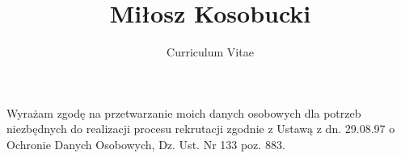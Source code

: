 \documentclass[polish]{curve}
\title{Miłosz Kosobucki}
\subtitle{Curriculum Vitae}
\newcommand{\inPolish}[1]{#1}
\newcommand{\inEnglish}[1]{}
\begin{document}
\newcommand{\CC}{C\nolinebreak\hspace{-.05em}\raisebox{.4ex}{\tiny\textbf+}\nolinebreak\hspace{-.10em}\raisebox{.4ex}{\tiny\textbf+}}
\newcommand{\GTK}{GTK\nolinebreak\hspace{-.05em}\raisebox{.4ex}{\tiny\textbf+}}

\prefix{}
\makeheaders
\maketitle
{}
\vfill
\inEnglish{I hereby agree to have my personal data processed strictly for the purposes of job recruitment pursuant to the Act on Protection of Personal Data of 29 August 1997 (Journal of Laws, no. 133, item 883)}
\inPolish{Wyrażam zgodę na przetwarzanie moich danych osobowych dla potrzeb niezbędnych do realizacji
procesu rekrutacji zgodnie z Ustawą z dn. 29.08.97 o Ochronie Danych Osobowych, Dz. Ust. Nr 133 poz.
883.}
\end{document}
